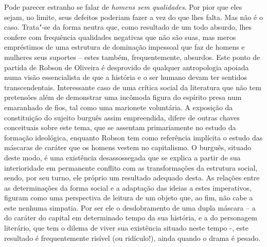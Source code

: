 Pode parecer estranho se falar de \emph{homens sem qualidades}. Por pior
que eles sejam, no limite, seus defeitos poderiam fazer a vez do que
lhes falta. Mas não é o caso. Trata"-se da forma neutra que, como
resultado de um todo absurdo, lhes confere com frequência qualidades
negativas que não são suas, mas meros empréstimos de uma estrutura de
dominação impessoal que faz de homens e mulheres seus suportes -- estes
também, frequentemente, absurdos. Este ponto de partida de Robson de
Oliveira é desprovido de qualquer antropologia apoiada numa visão
essencialista de que a história e o ser humano devam ter sentidos
transcendentais. Interessante caso de uma crítica social da literatura
que não tem pretensões além de demonstrar uma incômoda figura do
espírito presa num emaranhado de fios, tal como uma marionete
voluntária. A exposição da constituição do sujeito burguês assim
empreendida, difere de outras chaves conceituais sobre este tema, que se
assentam primariamente no estudo da formação ideológica, enquanto Robson
tem como referência implícita o estudo das máscaras de caráter que os
homens vestem no capitalismo. O burguês, situado deste modo, é uma
existência desassossegada que se explica a partir de sua interioridade
em permanente conflito com as transformações da estrutura social, sendo,
por seu turno, ele próprio um resultado adequado desta. As relações
entre as determinações da forma social e a adaptação das ideias a estes
imperativos, figuram como uma perspectiva de leitura de um objeto que,
ao fim, não cabe a este nenhuma simpatia. Por ser ele o desdobramento de
uma dupla máscara -- a do caráter do capital em determinado tempo da sua
história, e a do personagem literário, que tem o dilema de viver sua
existência situado neste tempo -, este resultado é frequentemente
risível (ou ridículo!), ainda quando o drama é pesado.

